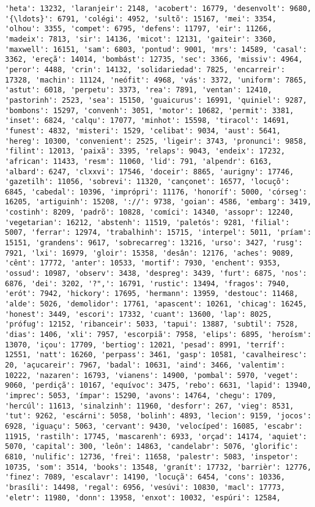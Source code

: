 \documentclass[11pt]{article}
\begin{document}
\begin{Verbatim}[commandchars=\\\{\}]
'heta': 13232, 'laranjeir': 2148, 'acobert': 16779, 'desenvolt': 9680, '{\ldots}': 6791, 'colégi': 4952, 'sultõ': 15167, 'mei': 3354, 'olhou': 3355, 'compet': 6795, 'defens': 11797, 'eir': 11266, 'madeix': 7813, 'sir': 14136, 'micot': 12131, 'gaiteir': 3360, 'maxwell': 16151, 'sam': 6803, 'pontud': 9001, 'mrs': 14589, 'casal': 3362, 'ereçã': 14014, 'bombást': 12735, 'sec': 3366, 'missiv': 4964, 'peror': 4488, 'crin': 14132, 'solidariedad': 7825, 'encarreir': 17328, 'machin': 11124, 'neófit': 4968, 'vás': 3372, 'uniform': 7865, 'astut': 6018, 'perpetu': 3373, 'rea': 7891, 'ventan': 12410, 'pastorinh': 2523, 'sea': 15150, 'guaicurus': 16991, 'quiniel': 9287, 'bombons': 15297, 'convenh': 3051, 'motor': 10682, 'permit': 3381, 'inset': 6824, 'calqu': 17077, 'minhot': 15598, 'tiracol': 14691, 'funest': 4832, 'misteri': 1529, 'celibat': 9034, 'aust': 5641, 'hereg': 10300, 'convenient': 2525, 'ligeir': 3743, 'pronunci': 9858, 'filint': 12013, 'paixã': 3395, 'relaps': 9043, 'endeix': 17232, 'african': 11433, 'resm': 11060, 'lid': 791, 'alpendr': 6163, 'albard': 6247, 'clxxvi': 17546, 'doceir': 8865, 'aurigny': 17746, 'gazetilh': 11056, 'sobrevi': 11320, 'cançonet': 16577, 'locuçõ': 6845, 'cabedal': 10396, 'imprópri': 11176, 'honoríf': 5000, 'córseg': 16205, 'artiguinh': 15208, '://': 9738, 'goian': 4586, 'embarg': 3419, 'costinh': 8209, 'padrõ': 10828, 'comíci': 14340, 'assopr': 12240, 'vegetarian': 16212, 'abstenh': 11519, 'paletós': 9281, 'filial': 5007, 'ferrar': 12974, 'trabalhinh': 15715, 'interpel': 5011, 'príam': 15151, 'grandens': 9617, 'sobrecarreg': 13216, 'urso': 3427, 'rusg': 7921, 'lxi': 16979, 'gloir': 15358, 'desân': 12176, 'aches': 9089, 'cênt': 17772, 'anter': 10533, 'mortif': 7930, 'enchent': 9353, 'ossud': 10987, 'observ': 3438, 'despreg': 3439, 'furt': 6875, 'nos': 6876, 'dei': 3202, '?",': 16791, 'rustic': 13494, 'fragos': 7940, 'erót': 7942, 'hickory': 17695, 'hermann': 13959, 'destouc': 11468, 'alde': 5026, 'demolidor': 17761, 'apascent': 10261, 'chicag': 16245, 'honest': 3449, 'escori': 17332, 'cuant': 13600, 'lap': 8025, 'prófug': 12152, 'ribanceir': 5033, 'tapui': 13887, 'subtil': 7528, 'dias': 1406, 'xli': 7957, 'escorpiã': 7958, 'elips': 6895, 'heroísm': 13070, 'içou': 17709, 'bertiog': 12021, 'pesad': 8991, 'terríf': 12551, 'natt': 16260, 'perpass': 3461, 'gasp': 10581, 'cavalheiresc': 20, 'açucareir': 7967, 'badal': 10631, 'aind': 3466, 'valentim': 10222, 'nazaren': 16793, 'vianens': 14900, 'pombal': 5970, 'veget': 9060, 'perdiçã': 10167, 'equívoc': 3475, 'rebo': 6631, 'lapid': 13940, 'imprec': 5053, 'ímpar': 15290, 'avons': 14764, 'chegu': 1709, 'hercúl': 11613, 'sinalzinh': 11960, 'desforr': 267, 'vieg': 8531, 'tut': 9262, 'escárni': 5058, 'bolinh': 4893, 'lecion': 9159, 'jocos': 6928, 'iguaçu': 5063, 'cervant': 9430, 'velocíped': 16085, 'escabr': 11915, 'rastilh': 17745, 'mascarenh': 6933, 'orçad': 14174, 'aquiet': 5070, 'capital': 300, 'leôn': 14863, 'candelabr': 5076, 'glorific': 6810, 'nulific': 12736, 'frei': 11658, 'palestr': 5083, 'inspetor': 10735, 'som': 3514, 'books': 13548, 'granít': 17732, 'barrièr': 12776, 'finez': 7089, 'escalavr': 14190, 'locuçã': 6454, 'cons': 10336, 'brasíli': 14498, 'regal': 6956, 'vesúvi': 10830, 'macl': 17773, 'eletr': 11980, 'donn': 13958, 'enxot': 10032, 'espúri': 12584, 
\end{Verbatim}
\end{document}
